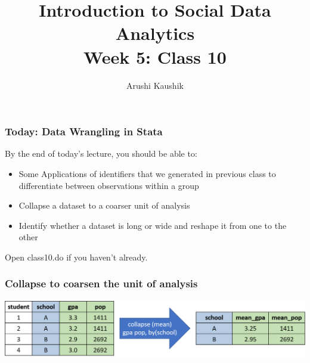\documentclass[11pt]{beamer}
\title[Class 10]{Introduction to Social Data Analytics \\
	\bigskip Week 5: Class 10}
\author[Kaushik]{Arushi Kaushik}
\institute[UCSD]{arkaushi@ucsd.edu}
\date[Week5]{}
\begin{document}
\frame{\titlepage}


\begin{frame}
\frametitle{Today: Data Wrangling in Stata}
By the end of today's lecture, you should be able to: \medskip
\begin{itemize} \itemsep1em
	\item Some Applications of identifiers that we generated in previous class to differentiate between observations within a group 
	\item Collapse a dataset to a coarser unit of analysis
	\item Identify whether a dataset is long or wide and reshape it from one to the other
\end{itemize} \bigskip
Open class10.do if you haven't already. 
\end{frame}


\begin{frame}
\frametitle{Collapse to coarsen the unit of analysis}
\begin{center}
	\includegraphics[width=\textwidth]{images/collapse.png}
\end{center}
\end{frame}
\end{document}
